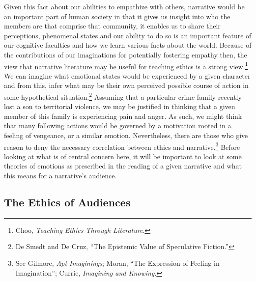 \documentclass[
  12pt,
]{book}
\theoremstyle{definition}
\theoremstyle{definition}
\theoremstyle{definition}
\theoremstyle{definition}
\theoremstyle{remark}
\begin{document}
Given this fact about our abilities to empathize with others, narrative would be an important part of human society in that it gives us insight into who the members are that comprise that community, it enables us to share their perceptions, phenomenal states and our ability to do so is an important feature of our cognitive faculties and how we learn various facts about the world. Because of the contributions of our imaginations for potentially fostering empathy then, the view that narrative literature may be useful for teaching ethics is a strong view.\footnote{Choo, \emph{Teaching Ethics Through Literature}.} We can imagine what emotional states would be experienced by a given character and from this, infer what may be their own perceived possible course of action in some hypothetical situation.\footnote{De Smedt and De Cruz, {``The Epistemic Value of Speculative Fiction.''}} Assuming that a particular crime family recently lost a son to territorial violence, we may be justified in thinking that a given member of this family is experiencing pain and anger. As such, we might think that many following actions would be governed by a motivation rooted in a feeling of vengeance, or a similar emotion. Nevertheless, there are those who give reason to deny the necessary correlation between ethics and narrative.\footnote{See Gilmore, \emph{Apt {Imaginings}}; Moran, {``The {Expression} of {Feeling} in {Imagination}''}; Currie, \emph{Imagining and Knowing}.} Before looking at what is of central concern here, it will be important to look at some theories of emotions as prescribed in the reading of a given narrative and what this means for a narrative's audience.

\subsection*{The Ethics of Audiences}\label{the-ethics-of-audiences}
\end{document}
